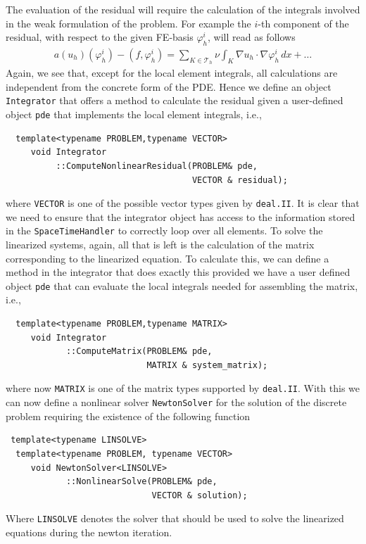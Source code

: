 \documentclass[smallextended]{svjour3}       %
\numberwithin{equation}{section}
\renewcommand{\phi}{\varphi}
\newcommand{\deal}{\texttt{deal.II}}
\begin{document}
The evaluation of the residual will require the calculation of the integrals 
involved in the weak formulation of the problem. For example 
the $i$-th component of the residual, with respect to the given FE-basis 
$\phi_{h}^{i}$, will read as follows
\begin{align}\label{eq:residual_vector}
 a(u_h)(\phi_{h}^{i}) - (f,\phi_{h}^{i}) = \sum_{K\in \mathcal T_h} \nu\int_K \nabla u_h\cdot \nabla \phi_{h}^{i}\,dx + \ldots
 \end{align}
Again, we see that, except for the local element integrals, all 
calculations are independent from the concrete form of the PDE. 
Hence we define an object \texttt{Integrator}
that offers a method to calculate the residual given a user-defined 
object \texttt{pde} that implements the local element integrals, i.e.,
\begin{lstlisting}
  template<typename PROBLEM,typename VECTOR>
     void Integrator
          ::ComputeNonlinearResidual(PROBLEM& pde, 
                                     VECTOR & residual);
\end{lstlisting}
where \texttt{VECTOR} is one of the possible vector types given by \deal{}.
It is clear that we need to ensure that the integrator object has access
to the information stored in the \texttt{SpaceTimeHandler}
to correctly loop over all elements.
To solve the linearized systems, again, all that is left is the calculation
of the matrix corresponding to the linearized equation. To calculate this,
 we can define a method in the integrator that does exactly this provided
we have a user defined object \texttt{pde} that can evaluate the local 
integrals needed for assembling the matrix, i.e.,
\begin{lstlisting}
  template<typename PROBLEM,typename MATRIX>
     void Integrator
            ::ComputeMatrix(PROBLEM& pde, 
                            MATRIX & system_matrix);
\end{lstlisting}
where now \texttt{MATRIX} is one of the matrix types supported by \deal{}.
With this we can now define a nonlinear solver \texttt{NewtonSolver} 
for the solution of the discrete problem requiring the existence of the 
following function
\begin{lstlisting}
 template<typename LINSOLVE>
  template<typename PROBLEM, typename VECTOR>
     void NewtonSolver<LINSOLVE>
            ::NonlinearSolve(PROBLEM& pde, 
                             VECTOR & solution);
\end{lstlisting}
Where \texttt{LINSOLVE} denotes the solver that should be used to solve the 
linearized equations during the newton iteration.
\end{document}
